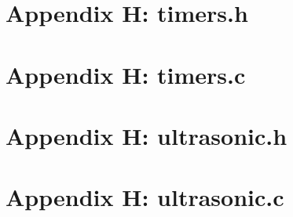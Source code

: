 \documentclass[letterpaper,11pt]{texMemo} %
\begin{document}
\section*{Appendix H: timers.h}
\begin{tiny}

\end{tiny}
\newpage

\section*{Appendix H: timers.c}
\begin{tiny}

\end{tiny}
\newpage

\section*{Appendix H: ultrasonic.h}
\begin{tiny}

\end{tiny}
\newpage

\section*{Appendix H: ultrasonic.c}
\begin{tiny}

\end{tiny}
\newpage
\end{document}
